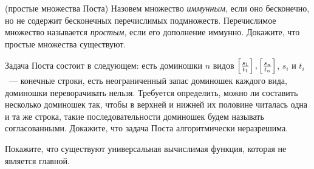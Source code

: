 \breakline

\begin{ptask}{18} (простые множества Поста)
    Назовем множество {\it иммунным}, если оно бесконечно, но не содержит бесконечных перечислимых подмножеств. Перечислимое
    множество называется {\it простым}, если его дополнение иммунно. Докажите, что простые множества существуют.
\end{ptask}

\begin{ptask}{21}
	Задача Поста состоит в следующем: есть доминошки $n$ видов $\left[\frac{s_1}{t_1}\right], \left[\frac{s_n}{t_n}\right]$, $s_i$ и $t_i$~--- конечные
    строки, есть неограниченный запас доминошек каждого вида, доминошки переворачивать нельзя. Требуется определить, можно ли
    составить несколько доминошек так, чтобы в верхней и нижней их половине читалась одна и та же строка, такие последовательности
    доминошек будем называть согласованными. Докажите, что задача Поста алгоритмически неразрешима.
\end{ptask}

\begin{ptask}{26}
   Покажите, что существуют универсальная вычислимая функция, которая не является главной.
\end{ptask}
